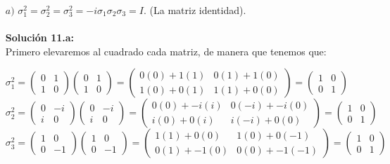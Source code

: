 \begin{itemize}
    \item [$a)$] $\sigma_1^2 = \sigma_2^2 =\sigma_3^2 = -i \sigma_1 \sigma_2 \sigma_3 = I$. (La matriz identidad). \\\\
    \textbf{Soluci\'on 11.a:}\\
    Primero elevaremos al cuadrado cada matriz, de manera que tenemos que: 

\[\sigma_1^2 = \begin{pmatrix} 0 & 1 \\ 1 & 0 \end{pmatrix}\begin{pmatrix} 0 & 1 \\ 1 & 0 \end{pmatrix}=\begin{pmatrix} 0(0)+1(1) & 0(1)+1(0) \\ 1(0)+0(1) & 1(1)+0(0) \end{pmatrix}=\begin{pmatrix} 1 & 0 \\ 0 & 1 \end{pmatrix}\]
\[\sigma_2^2 = \begin{pmatrix} 0 & -i \\ i & 0 \end{pmatrix}\begin{pmatrix} 0 & -i \\ i & 0 \end{pmatrix}=\begin{pmatrix} 0(0)+-i(i) & 0(-i)+-i(0) \\ i(0)+0(i) & i(-i)+0(0) \end{pmatrix}=\begin{pmatrix} 1 & 0 \\ 0 & 1 \end{pmatrix}\]
\[\sigma_3^2 = \begin{pmatrix} 1 & 0 \\ 0 & -1 \end{pmatrix}\begin{pmatrix} 1 & 0 \\ 0 & -1 \end{pmatrix}=\begin{pmatrix} 1(1)+0(0) & 1(0)+0(-1) \\ 0(1)+-1(0) & 0(0)+-1(-1) \end{pmatrix}=\begin{pmatrix} 1 & 0 \\ 0 & 1 \end{pmatrix}\]

\end{itemize}
